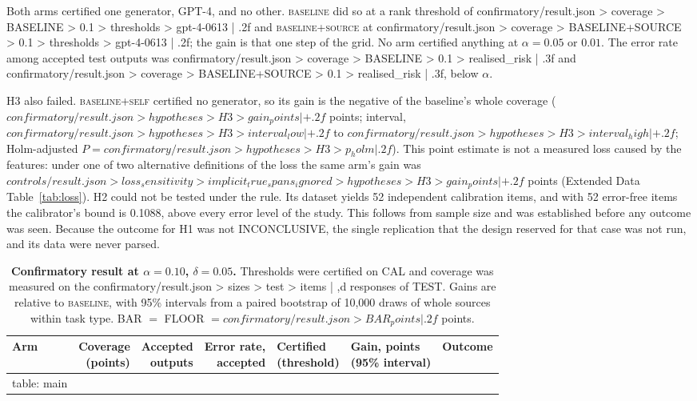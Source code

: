 \documentclass[11pt]{article}
\newcommand{\arm}[1]{\textsc{#1}}
\begin{document}
Both arms certified one generator, GPT-4, and no other. \arm{baseline} did so at a rank threshold of {{confirmatory/result.json > coverage > BASELINE > 0.1 > thresholds > gpt-4-0613 | .2f}} and \arm{baseline+source} at {{confirmatory/result.json > coverage > BASELINE+SOURCE > 0.1 > thresholds > gpt-4-0613 | .2f}}; the gain is that one step of the grid. No arm certified anything at $\alpha = 0.05$ or $0.01$. The error rate among accepted test outputs was {{confirmatory/result.json > coverage > BASELINE > 0.1 > realised_risk | .3f}} and {{confirmatory/result.json > coverage > BASELINE+SOURCE > 0.1 > realised_risk | .3f}}, below $\alpha$.

H3 also failed. \arm{baseline+self} certified no generator, so its gain is the negative of the baseline's whole coverage (${{confirmatory/result.json > hypotheses > H3 > gain_points | +.2f}}$ points; interval, ${{confirmatory/result.json > hypotheses > H3 > interval_low | +.2f}}$ to ${{confirmatory/result.json > hypotheses > H3 > interval_high | +.2f}}$; Holm-adjusted $P = {{confirmatory/result.json > hypotheses > H3 > p_holm | .2f}}$). This point estimate is not a measured loss caused by the features: under one of two alternative definitions of the loss the same arm's gain was ${{controls/result.json > loss_sensitivity > implicit_true_spans_ignored > hypotheses > H3 > gain_points | +.2f}}$ points (Extended Data Table~\ref{tab:loss}). H2 could not be tested under the rule. Its dataset\cite{selfcheck} yields 52 independent calibration items, and with 52 error-free items the calibrator's bound is 0.1088, above every error level of the study. This follows from sample size and was established before any outcome was seen. Because the outcome for H1 was not INCONCLUSIVE, the single replication that the design reserved for that case was not run, and its data were never parsed.

\begin{table}[t]
\centering
\small
\caption{\textbf{Confirmatory result at $\alpha = 0.10$, $\delta = 0.05$.} Thresholds were certified on CAL and coverage was measured on the {{confirmatory/result.json > sizes > test > items | ,d}} responses of TEST. Gains are relative to \arm{baseline}, with 95\% intervals from a paired bootstrap of 10,000 draws of whole sources within task type. BAR $=$ FLOOR $= {{confirmatory/result.json > BAR_points | .2f}}$ points.}
\label{tab:main}
\footnotesize
\setlength{\tabcolsep}{4.5pt}
\begin{tabular}{@{}lrrrlll@{}}
\toprule
Arm & \shortstack[r]{Coverage\\(points)} & \shortstack[r]{Accepted\\outputs} & \shortstack[r]{Error rate,\\accepted} & \shortstack[l]{Certified\\(threshold)} & \shortstack[l]{Gain, points\\(95\% interval)} & Outcome \\
\midrule
{{table: main}}
\bottomrule
\end{tabular}
\end{table}
\end{document}
